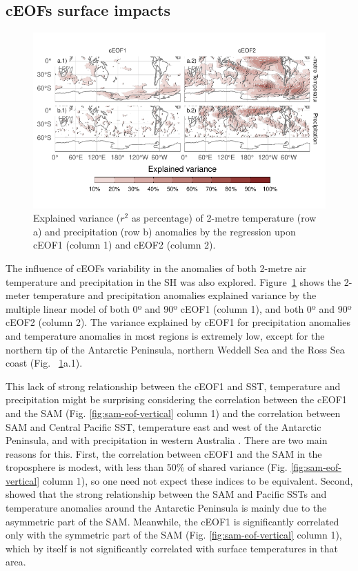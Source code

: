 \documentclass[pdflatex,sn-basic]{sn-jnl}
\theoremstyle{thmstyleone}%
\theoremstyle{thmstyletwo}%
\theoremstyle{thmstylethree}%
\begin{document}
\hypertarget{precipitation}{%
\subsection{cEOFs surface impacts}\label{precipitation}}

\begin{figure}
\centering
\includegraphics{../figures/pp-t2m-r2-1.pdf}
\caption{\label{fig:pp-t2m-r2}Explained variance (\(r^2\) as percentage) of 2-metre temperature (row a) and precipitation (row b) anomalies by the regression upon cEOF1 (column 1) and cEOF2 (column 2).}
\end{figure}



The influence of cEOFs variability in the anomalies of both 2-metre air temperature and precipitation in the SH was also explored.
Figure~\ref{fig:pp-t2m-r2} shows the 2-meter temperature and precipitation anomalies explained variance by the multiple linear model of both 0º and 90º cEOF1 (column 1), and both 0º and 90º cEOF2 (column 2).
The variance explained by cEOF1 for precipitation anomalies and temperature anomalies in most regions is extremely low, except for the northern tip of the Antarctic Peninsula, northern Weddell Sea and the Ross Sea coast (Fig.~ \ref{fig:pp-t2m-r2}a.1).

This lack of strong relationship between the cEOF1 and SST, temperature and precipitation might be surprising considering the correlation between the cEOF1 and the SAM (Fig. \ref{fig:sam-eof-vertical} column 1) and the correlation between SAM and Central Pacific SST, temperature east and west of the Antarctic Peninsula, and with precipitation in western Australia \citep{fogt2020}.
There are two main reasons for this.
First, the correlation between cEOF1 and the SAM in the troposphere is modest, with less than 50\% of shared variance (Fig. \ref{fig:sam-eof-vertical} column 1), so one need not expect these indices to be equivalent.
Second, \citet{campitelli2022} showed that the strong relationship between the SAM and Pacific SSTs and temperature anomalies around the Antarctic Peninsula is mainly due to the asymmetric part of the SAM.
Meanwhile, the cEOF1 is significantly correlated only with the symmetric part of the SAM (Fig. \ref{fig:sam-eof-vertical} column 1), which by itself is not significantly correlated with surface temperatures in that area.
\end{document}
